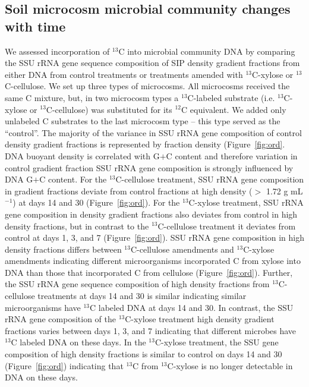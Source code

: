 \subsection{Soil microcosm microbial community changes with time}
We assessed incorporation of $^{13}$C into microbial community DNA by comparing the
SSU rRNA gene sequence composition of SIP density gradient fractions from
either DNA from control treatments or treatments amended with $^{13}$C-xylose
or $^{13}$C-cellulose. We set up three types of microcosms.
All microcosms received the same C mixture, but, in two microcosm types
a $^{13}$C-labeled substrate (i.e. $^{13}$C-xylose or $^{13}$C-cellulose) was
substituted for its $^{12}$C equivalent. We added only unlabeled C substrates
to the last microcosm type -- this type served as the ``control''. The majority
of the variance in SSU rRNA gene composition of control density gradient
fractions is represented by fraction density (Figure~\ref{fig:ord}. DNA buoyant
density is correlated with G$+$C content \citep{Buckley_2007} and therefore
variation in control gradient fraction SSU rRNA gene composition is strongly
influenced by DNA G$+$C content. For the $^{13}$C-cellulose treatment, SSU rRNA
gene composition in gradient fractions deviate from control fractions at high
density ($>$ 1.72 g mL$^{-1}$) at days 14 and 30 (Figure~\ref{fig:ord}). For
the $^{13}$C-xylose treatment, SSU rRNA gene composition in density gradient
fractions also deviates from control in high density fractions, but in contrast
to the $^{13}$C-cellulose treatment it deviates from control at days 1, 3, and
7 (Figure~\ref{fig:ord}). SSU rRNA gene composition in high density fractions
differs between $^{13}$C-cellulose amendments and $^{13}$C-xylose amendments
indicating different microorganisms incorporated C from xylose into DNA than
those that incorporated C from cellulose (Figure~\ref{fig:ord}). Further, the
SSU rRNA gene sequence composition of high density fractions from
$^{13}$C-cellulose treatments at days 14 and 30 is similar indicating similar
microorganisms have $^{13}$C labeled DNA at days 14 and 30. In contrast, the
SSU rRNA gene composition of the $^{13}$C-xylose treatment high density
gradient fractions varies between days 1, 3, and 7 indicating that different
microbes have $^{13}$C labeled DNA on these days. In the $^{13}$C-xylose
treatment, the SSU gene composition of high density fractions is similar to
control on days 14 and 30 (Figure~\ref{fig:ord}) indicating that $^{13}$C from
$^{13}$C-xylose is no longer detectable in DNA on these days. 

